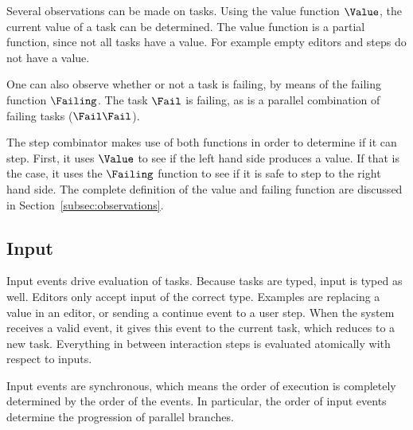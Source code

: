 Several observations can be made on tasks.
Using the value function $\Value$, the current value of a task can be determined.
The value function is a partial function, since not all tasks have a value.
For example empty editors and steps do not have a value.

One can also observe whether or not a task is failing, by means of the failing function $\Failing$.
The task $\Fail$ is failing, as is a parallel combination of failing tasks ($\Fail \And \Fail$).

The step combinator makes use of both functions in order to determine if it can step.
First, it uses $\Value$ to see if the left hand side produces a value.
If that is the case, it uses the $\Failing$ function to see if it is safe to step to the right hand side.
The complete definition of the value and failing function are discussed in Section~\ref{subsec:observations}.



\subsection{Input}

Input events drive evaluation of tasks.
Because tasks are typed, input is typed as well.
Editors only accept input of the correct type.
Examples are replacing a value in an editor,
or sending a continue event to a user step.
When the system receives a valid event, it gives this event to the current task, which reduces to a new task.
Everything in between interaction steps is evaluated atomically with respect to inputs.

Input events are synchronous, which means the order of execution is completely determined by the order of the events.
In particular, the order of input events determine the progression of parallel branches.
